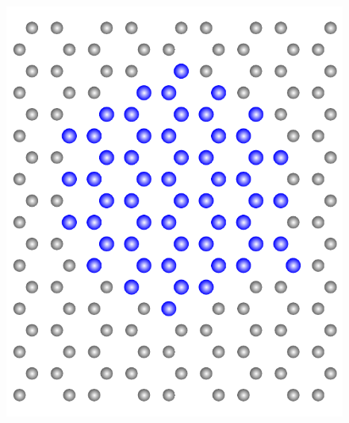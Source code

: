 \documentclass[a4paper, 10pt, twoside, openany]{book} %
\begin{document}
\begin{figure}
    \begin{minipage}[b]{0.24\textwidth}
        \includegraphics[width=\textwidth]{Abbildungen/C2X2.pdf}
        \label{C2X2-Insel}
    \end{minipage}
    \hfill
    \begin{minipage}[b]{0.24\textwidth}

\end{minipage}
\end{figure}
\end{document}
